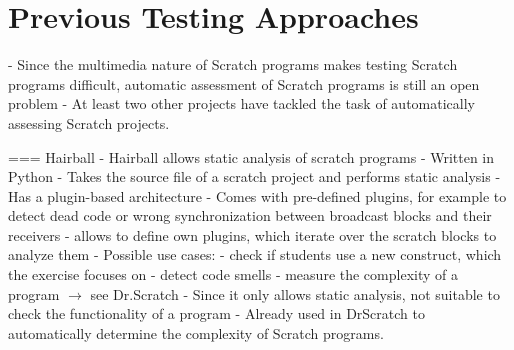 %

\section{Previous Testing Approaches}

- Since the multimedia nature of Scratch programs makes testing Scratch programs difficult,
  automatic assessment of Scratch programs is still an open problem
- At least two other projects have tackled the task of automatically assessing Scratch projects.

=== Hairball
- Hairball \cite{hairball} allows static analysis of scratch programs
- Written in Python
- Takes the source file of a scratch project and performs static analysis
- Has a plugin-based architecture
    - Comes with pre-defined plugins, for example to detect dead code or wrong synchronization between broadcast blocks and their receivers
    - allows to define own plugins, which iterate over the scratch blocks to analyze them
- Possible use cases:
    - check if students use a new construct, which the exercise focuses on
    - detect code smells
    - measure the complexity of a program $\rightarrow$ see Dr.Scratch
- Since it only allows static analysis, not suitable to check the functionality of a program
- Already used in DrScratch \cite{drscratch} to automatically determine the complexity of Scratch programs.

